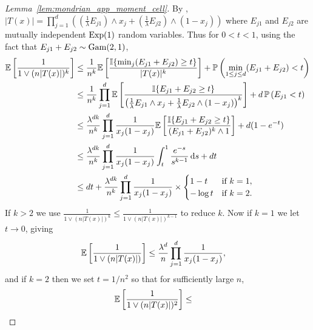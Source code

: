 \begin{proof}[Lemma~\ref{lem:mondrian_app_moment_cell}]

  By \citet[Proposition~1]{mourtada2020minimax},
  $|T(x)| = \prod_{j=1}^{d}
  \left(
    \left(\frac{1}{\lambda} E_{j1} \right) \wedge x_j
    + \left( \frac{1}{\lambda} E_{j2} \right) \wedge (1-x_j)
  \right)$
  where $E_{j1}$ and $E_{j2}$
  are mutually independent $\operatorname{Exp}(1)$ random variables.
  Thus for $0<t<1$,
  using the fact that $E_{j1} + E_{j2} \sim \operatorname{Gam}(2, 1)$,
  \begin{align*}
    \mathbb{E} \left[
      \frac{1}{1 \vee (n |T(x)|)^k}
    \right]
    &\leq
    \frac{1}{n^k}
    \mathbb{E} \left[
      \frac{\mathbb{I}\{\min_j (E_{j1} + E_{j2}) \geq t\}}{|T(x)|^k}
    \right]
    + \mathbb{P} \left(\min_{1 \leq j \leq d} (E_{j1} + E_{j2}) < t\right) \\
    &\leq
    \frac{1}{n^k}
    \prod_{j=1}^d
    \mathbb{E} \left[
      \frac{\mathbb{I}\{E_{j1} + E_{j2} \geq t\}}
      {\left(\frac{1}{\lambda} E_{j1} \wedge x_j
      + \frac{1}{\lambda} E_{j2} \wedge (1-x_j)\right)^k}
    \right]
    + d\, \mathbb{P} \left(E_{j1} < t\right) \\
    &\leq
    \frac{\lambda^{d k}}{n^k}
    \prod_{j=1}^d
    \frac{1}{x_j(1-x_j)}
    \mathbb{E} \left[
      \frac{\mathbb{I}\{E_{j1} + E_{j2} \geq t\}}
      {(E_{j1} + E_{j2})^k \wedge 1}
    \right]
    + d (1 - e^{-t}) \\
    &\leq
    \frac{\lambda^{d k}}{n^k}
    \prod_{j=1}^d
    \frac{1}{x_j(1-x_j)}
    \int_{t}^{1}
    \frac{e^{-s}}{s^{k-1}}
    \,\mathrm{d}s
    + d t \\
    &\leq
    d t
    + \frac{\lambda^{d k}}{n^k}
    \prod_{j=1}^d
    \frac{1}{x_j(1-x_j)}
    \times
    \begin{cases}
      1-t & \text{if } k = 1, \\
      -\log t & \text{if } k = 2.
    \end{cases}
  \end{align*}
  If $k>2$ we use
  $\frac{1}{1 \vee (n |T(x)|)^k} \leq \frac{1}{1 \vee (n |T(x)|)^{k-1}}$
  to reduce $k$. Now if $k = 1$ we let $t \to 0$, giving
  \begin{align*}
    \mathbb{E} \left[
      \frac{1}{1 \vee (n |T(x)|)}
    \right]
    &\leq
    \frac{\lambda^d}{n}
    \prod_{j=1}^d
    \frac{1}{x_j(1-x_j)},
  \end{align*}
  and if $k = 2$ then we set $t = 1/n^2$ so that for
  sufficiently large $n$,
  \begin{align*}
    \E \left[
      \frac{1}{1 \vee (n |T(x)|)^2}
    \right]
    &\leq

\end{align*}
\end{proof}
